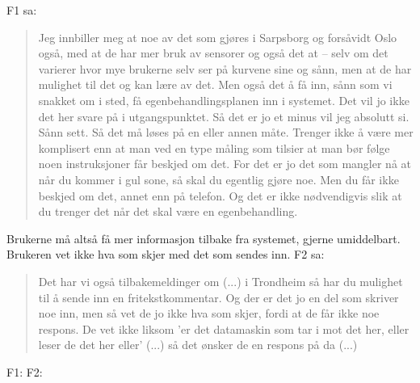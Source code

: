 F1 sa:
\blockquote{Jeg innbiller meg at noe av det som gjøres i Sarpsborg og forsåvidt Oslo også, med at de har mer bruk av sensorer og også det at -- selv om det varierer hvor
    mye brukerne selv ser på kurvene sine og sånn, men at de har mulighet til det og kan lære av det. Men også det å få inn, sånn som vi snakket om i sted, få
    egenbehandlingsplanen inn i systemet. Det vil jo ikke det her svare på i utgangspunktet. Så det er jo et minus vil jeg absolutt si. Sånn sett. Så det må løses på en
    eller annen måte. Trenger ikke å være mer komplisert enn at man ved en type måling som tilsier at man bør følge noen instruksjoner får beskjed om det. For det er jo
    det som mangler nå at når du kommer i gul sone, så skal du egentlig gjøre noe. Men du får ikke beskjed om det, annet enn på telefon. Og det er ikke nødvendigvis slik
at du trenger det når det skal være en egenbehandling.}

Brukerne må altså få mer informasjon tilbake fra systemet, gjerne umiddelbart. Brukeren vet ikke hva som skjer med det som sendes inn.
F2 sa:
\blockquote{Det har vi også tilbakemeldinger om (...) i Trondheim så har du mulighet til å sende inn en fritekstkommentar. Og der er det jo en del som skriver
    noe inn, men så vet de jo ikke hva som skjer, fordi at de får ikke noe respons. De vet ikke liksom 'er det datamaskin som tar i mot det her, eller leser de det her
eller' (...) så det ønsker de en respons på da (...)}

F1:  \newline
F2: 
